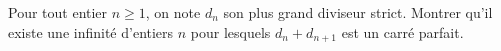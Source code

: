 Pour tout entier $n\ge 1$, on note $d_n$ son plus grand diviseur strict. Montrer qu'il existe une infinité d'entiers $n$ pour lesquels $d_n + d_{n+1}$ est un carré parfait.